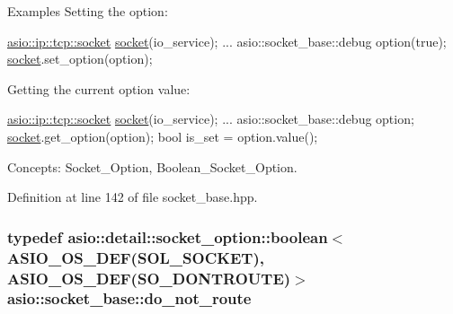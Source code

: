 \begin{DoxyParagraph}{Examples}
Setting the option\+: 
\begin{DoxyCode}
\hyperlink{classasio_1_1basic__stream__socket}{asio::ip::tcp::socket} \hyperlink{namespacewebsocketpp_1_1transport_1_1asio_1_1socket_1_1error_a828ddaa5ed63a761e1b557465a35f05aa0c31b356014843e1d09514e794a539a7}{socket}(io\_service); 
...
asio::socket\_base::debug option(\textcolor{keyword}{true});
\hyperlink{namespacewebsocketpp_1_1transport_1_1asio_1_1socket_1_1error_a828ddaa5ed63a761e1b557465a35f05aa0c31b356014843e1d09514e794a539a7}{socket}.set\_option(option);
\end{DoxyCode}

\end{DoxyParagraph}
\begin{DoxyParagraph}{}
Getting the current option value\+: 
\begin{DoxyCode}
\hyperlink{classasio_1_1basic__stream__socket}{asio::ip::tcp::socket} \hyperlink{namespacewebsocketpp_1_1transport_1_1asio_1_1socket_1_1error_a828ddaa5ed63a761e1b557465a35f05aa0c31b356014843e1d09514e794a539a7}{socket}(io\_service); 
...
asio::socket\_base::debug option;
\hyperlink{namespacewebsocketpp_1_1transport_1_1asio_1_1socket_1_1error_a828ddaa5ed63a761e1b557465a35f05aa0c31b356014843e1d09514e794a539a7}{socket}.get\_option(option);
\textcolor{keywordtype}{bool} is\_set = option.value();
\end{DoxyCode}

\end{DoxyParagraph}
\begin{DoxyParagraph}{Concepts\+:}
Socket\+\_\+\+Option, Boolean\+\_\+\+Socket\+\_\+\+Option. 
\end{DoxyParagraph}


Definition at line 142 of file socket\+\_\+base.\+hpp.

\hypertarget{classasio_1_1socket__base_ab7b1853c3ab069c31202a5ea11deb882}{}
\subsubsection[{do\+\_\+not\+\_\+route}]{\setlength{\rightskip}{0pt plus 5cm}typedef {\bf asio\+::detail\+::socket\+\_\+option\+::boolean}$<$ {\bf A\+S\+I\+O\+\_\+\+O\+S\+\_\+\+D\+E\+F}(S\+O\+L\+\_\+\+S\+O\+C\+K\+E\+T), {\bf A\+S\+I\+O\+\_\+\+O\+S\+\_\+\+D\+E\+F}(S\+O\+\_\+\+D\+O\+N\+T\+R\+O\+U\+T\+E)$>$ {\bf asio\+::socket\+\_\+base\+::do\+\_\+not\+\_\+route}}\label{classasio_1_1socket__base_ab7b1853c3ab069c31202a5ea11deb882}


